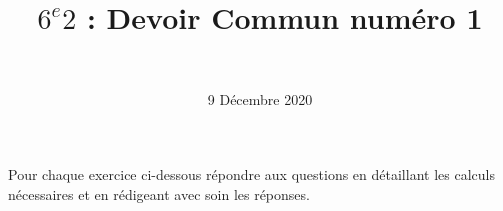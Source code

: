 \documentclass[a4paper,11pt]{exam}
\author{\ }
\date{9 Décembre 2020}
\title{$6^e 2$ : Devoir Commun num\'ero 1}
\makeatletter
\def\maketitle{{\centering%
		\par{\huge\textbf{\@title}}%
		\par{\@date}%
		\par}}
\makeatother
\begin{document}
%	

	\maketitle
%	


	
Pour chaque exercice ci-dessous répondre aux questions en  détaillant les calculs nécessaires et en rédigeant avec soin les réponses.
	










\label{LastPage}
\end{document}
